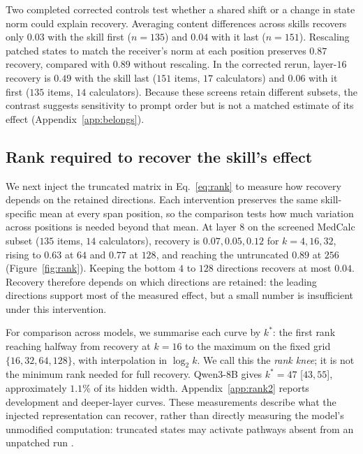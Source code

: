 \documentclass{article}
\begin{document}
Two completed corrected controls test whether a shared shift or a change in
state norm could explain recovery. Averaging content differences across skills
recovers only $0.03$ with the skill first ($n=135$) and $0.04$ with it last
($n=151$). Rescaling patched states to match the receiver's norm at each
position preserves $0.87$ recovery, compared with $0.89$ without rescaling.
In the corrected rerun, layer-$16$
recovery is $0.49$ with the skill last ($151$ items, $17$ calculators) and
$0.06$ with it first ($135$ items, $14$ calculators). Because these screens
retain different subsets, the contrast suggests sensitivity to prompt order
but is not a matched estimate of its effect (Appendix~\ref{app:belongs}).

\subsection{Rank required to recover the skill's effect}
\label{sec:rank}

We next inject the truncated matrix in Eq.~\ref{eq:rank} to measure how
recovery depends on the retained directions. Each intervention preserves the
same skill-specific mean at every span position, so the comparison tests how
much variation across positions is needed beyond that mean. At layer $8$ on
the screened MedCalc subset ($135$ items, $14$ calculators), recovery is
$0.07,0.05,0.12$ for $k=4,16,32$, rising to $0.63$ at $64$ and $0.77$ at
$128$, and reaching the untruncated $0.89$ at $256$ (Figure~\ref{fig:rank}).
Keeping the bottom $4$ to $128$ directions recovers at most $0.04$.
Recovery therefore depends on which directions are retained: the leading
directions support most of the measured effect, but a small number is
insufficient under this intervention.

For comparison across models, we summarise each curve by $k^{*}$: the first
rank reaching halfway from recovery at $k=16$ to the maximum on the fixed grid
$\{16,32,64,128\}$, with interpolation in $\log_2 k$. We call this the
\emph{rank knee}; it is not the minimum rank needed for full recovery.
Qwen3-8B gives $k^{*}=47$ [$43,55$], approximately $1.1\%$ of its hidden
width. Appendix~\ref{app:rank2} reports development and deeper-layer curves.
These measurements describe what the injected representation can recover,
rather than directly measuring the model's unmodified computation: truncated
states may activate pathways absent from an unpatched run
\citep{makelov2024illusion}.
\end{document}
